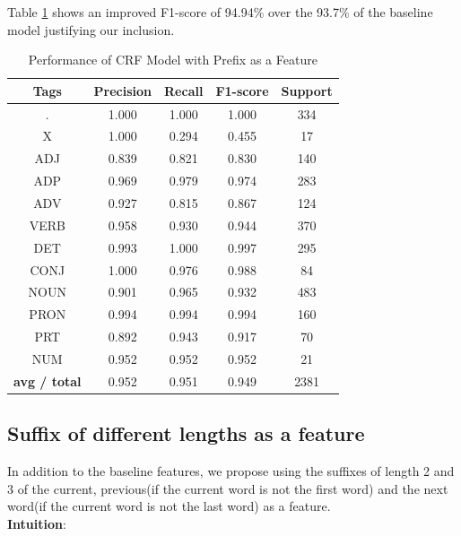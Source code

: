 \documentclass[12pt]{article}
\begin{document}
Table \ref{tab:table4} shows an improved F1-score of 94.94\% over the 93.7\% of the baseline model justifying our inclusion.
\begin{table}[h!]
\begin{center}
    \caption{Performance of CRF Model with Prefix as a Feature}
    \label{tab:table4}
\begin{tabular}{ c c c c c}
 \textbf{Tags}& \textbf{Precision} & \textbf{Recall} & \textbf{F1-score} & \textbf{Support} \\ 
 \hline

          .   &   1.000  &  1.000  &   1.000   &       334\\ 
          X   &   1.000  &   0.294  &   0.455  &      17\\ 
        ADJ   &   0.839  &   0.821  &   0.830  &     140\\ 
        ADP   &   0.969  &   0.979  &   0.974  &     283\\ 
        ADV   &   0.927  &   0.815  &   0.867  &     124\\ 
       VERB   &   0.958  &   0.930  &   0.944  &     370\\ 
        DET   &   0.993  &   1.000  &   0.997  &     295\\ 
       CONJ   &   1.000  &   0.976  &   0.988  &      84\\ 
       NOUN   &   0.901  &   0.965  &   0.932  &     483\\ 
       PRON   &   0.994   &  0.994  &   0.994  &     160\\ 
        PRT   &   0.892  &   0.943  &   0.917  &      70\\ 
        NUM    &  0.952 &    0.952  &   0.952  &      21\\ 
\hline
\textbf{avg / total} &     0.952 &    0.951 &     0.949  &    2381

\end{tabular}
\end{center}
\end{table}


\subsection{Suffix of different lengths as a feature}

In addition to the baseline features, we propose using the suffixes of length 2 and 3 of the current, previous(if the current word is not the first word) and the next word(if the current word is not the last word) as a feature.\\
\textbf{Intuition}:
\end{document}
